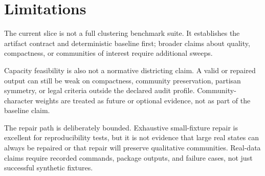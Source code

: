 \section{Limitations}

The current slice is not a full clustering benchmark suite. It establishes the
artifact contract and deterministic baseline first; broader claims about
quality, compactness, or communities of interest require additional sweeps.

Capacity feasibility is also not a normative districting claim. A valid or
repaired output can still be weak on compactness, community preservation,
partisan symmetry, or legal criteria outside the declared audit profile.
Community-character weights are treated as future or optional evidence, not as
part of the baseline claim.

The repair path is deliberately bounded. Exhaustive small-fixture repair is
excellent for reproducibility tests, but it is not evidence that large real
states can always be repaired or that repair will preserve qualitative
communities. Real-data claims require recorded commands, package outputs, and
failure cases, not just successful synthetic fixtures.
